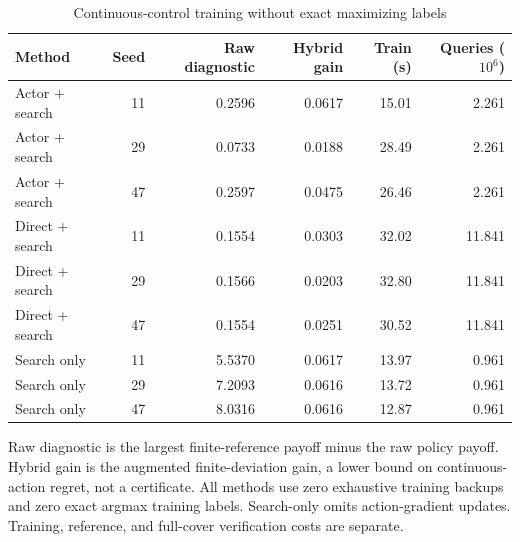 \begin{table}[htbp]\centering
\caption{Continuous-control training without exact maximizing labels}
\begin{small}\begin{tabular}{lrrrrr}
\toprule
Method & Seed & Raw diagnostic & Hybrid gain & Train (s) & Queries ($10^6$) \\
\midrule
Actor + search & 11 & 0.2596 & 0.0617 & 15.01 & 2.261 \\
Actor + search & 29 & 0.0733 & 0.0188 & 28.49 & 2.261 \\
Actor + search & 47 & 0.2597 & 0.0475 & 26.46 & 2.261 \\
Direct + search & 11 & 0.1554 & 0.0303 & 32.02 & 11.841 \\
Direct + search & 29 & 0.1566 & 0.0203 & 32.80 & 11.841 \\
Direct + search & 47 & 0.1554 & 0.0251 & 30.52 & 11.841 \\
Search only & 11 & 5.5370 & 0.0617 & 13.97 & 0.961 \\
Search only & 29 & 7.2093 & 0.0616 & 13.72 & 0.961 \\
Search only & 47 & 8.0316 & 0.0616 & 12.87 & 0.961 \\
\bottomrule\end{tabular}\end{small}
\par\smallskip\begin{minipage}{.96\linewidth}\footnotesize Raw diagnostic is the largest finite-reference payoff minus the raw policy payoff. Hybrid gain is the augmented finite-deviation gain, a lower bound on continuous-action regret, not a certificate. All methods use zero exhaustive training backups and zero exact argmax training labels. Search-only omits action-gradient updates. Training, reference, and full-cover verification costs are separate.\end{minipage}
\end{table}
